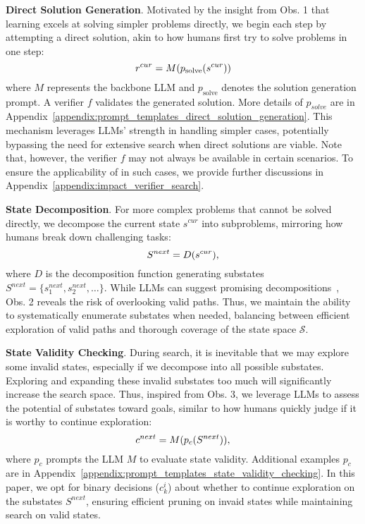 \noindent \textbf{Direct Solution Generation}. Motivated by the insight from Obs. 1 that learning excels at solving simpler problems directly, we begin each step by attempting a direct solution, akin to how humans first try to solve problems in one step:
\begin{equation}
\small
r^{cur} = M(p_{\text{solve}}(s^{cur}))
\end{equation}
where $M$ represents the backbone LLM and $p_{\text{solve}}$ denotes the solution generation prompt. A verifier $f$ validates the generated solution. More details of $p_{solve}$ are in Appendix~\ref{appendix:prompt_templates_direct_solution_generation}.  This mechanism leverages LLMs' strength in handling simpler cases, potentially bypassing the need for extensive search when direct solutions are viable. Note that, however, the verifier $f$ may not always be available in certain scenarios. To ensure the applicability of \method in such cases, we provide further discussions in Appendix~\ref{appendix:impact_verifier_search}.

\noindent \textbf{State Decomposition}. For more complex problems that cannot be solved directly, we decompose the current state $s^{cur}$ into subproblems, mirroring how humans break down challenging tasks:
\begin{equation}
\label{eq:state_decomposition}
\small
    S^{next} = D(s^{cur}),
\end{equation}
where $D$ is the decomposition function generating substates $S^{next} = \{s^{next}_1,s^{next}_2,\ldots\}$. While LLMs can suggest promising decompositions~\cite{yao2023tree}, Obs. 2 reveals the risk of overlooking valid paths. Thus, we maintain the ability to systematically enumerate substates when needed, balancing between efficient exploration of valid paths and thorough coverage of the state space $\mathcal{S}$.


\noindent \textbf{State Validity Checking}. 
During search, it is inevitable that we may explore some invalid states, especially if we decompose into all possible substates. Exploring and expanding these invalid substates too much will significantly increase the search space. Thus, inspired from Obs. 3, we leverage LLMs to assess the potential of substates toward goals, similar to how humans quickly judge if it is worthy to continue exploration:
\begin{equation}
\small
    c^{next} = M(p_c(S^{next})),
\end{equation}
where $p_c$ prompts the LLM $M$ to evaluate state validity. Additional examples $p_{c}$ are in Appendix~\ref{appendix:prompt_templates_state_validity_checking}. In this paper, we opt for binary decisions ($c^i_{k}$) about whether to continue exploration on the substates $S^{next}$, ensuring efficient pruning on invaid states while maintaining search on valid states.


